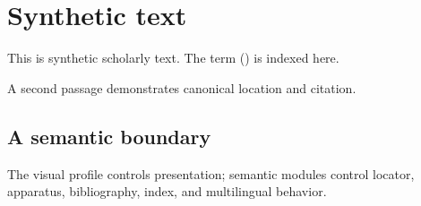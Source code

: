 \chapter{Synthetic text}
This is synthetic scholarly text. The term  () is indexed here.

A second passage demonstrates canonical location and citation.\autocite{synthetic2027}

\section{A semantic boundary}
The visual profile controls presentation; semantic modules control locator, apparatus, bibliography, index, and multilingual behavior.
